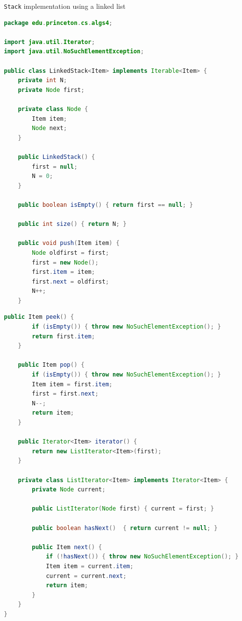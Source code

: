 \documentclass[8pt,a4paper,compress]{beamer}
\begin{document}
\begin{frame}[fragile]
\pause

\lstinline{Stack} implementation using a linked list

\smallskip

\begin{lstlisting}[language=Java,style=focusin]
package edu.princeton.cs.algs4;

import java.util.Iterator;
import java.util.NoSuchElementException;

public class LinkedStack<Item> implements Iterable<Item> {
    private int N; 
    private Node first; 
    
    private class Node {
        Item item;
        Node next;
    }

    public LinkedStack() {
        first = null; 
        N = 0;
    }

    public boolean isEmpty() { return first == null; }

    public int size() { return N; }

    public void push(Item item) {
        Node oldfirst = first;
        first = new Node(); 
        first.item = item;
        first.next = oldfirst;
        N++;
    }
\end{lstlisting}
\end{frame}

\begin{frame}[fragile]
\pause

\begin{lstlisting}[language=Java,style=focusin]
    public Item peek() {
        if (isEmpty()) { throw new NoSuchElementException(); }
        return first.item;
    }
    
    public Item pop() {
        if (isEmpty()) { throw new NoSuchElementException(); }
        Item item = first.item; 
        first = first.next; 
        N--;
        return item; 
    }

    public Iterator<Item> iterator() { 
        return new ListIterator<Item>(first); 
    }

    private class ListIterator<Item> implements Iterator<Item> {
        private Node current;

        public ListIterator(Node first) { current = first; }

        public boolean hasNext()  { return current != null; }

        public Item next() {
            if (!hasNext()) { throw new NoSuchElementException(); }
            Item item = current.item;
            current = current.next; 
            return item;
        }
    }
}
\end{lstlisting}
\end{frame}
\end{document}
